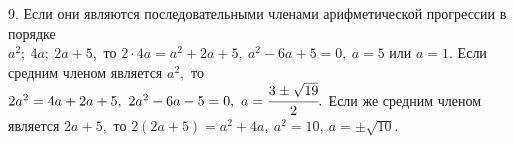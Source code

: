 9. Если они являются последовательными членами арифметической прогрессии в порядке\\ $a^2;\ 4a;\ 2a+5,$ то $2\cdot4a=a^2+2a+5,\ a^2-6a+5=0,\ a=5$ или $a=1.$ Если средним членом является $a^2,$ то $2a^2=4a+2a+5,\ 2a^2-6a-5=0,\ a=\cfrac{3\pm\sqrt{19}}{2}.$ Если же средним членом является $2a+5,$ то $2(2a+5)=a^2+4a,\ a^2=10,\ a=\pm\sqrt{10}.$\\
